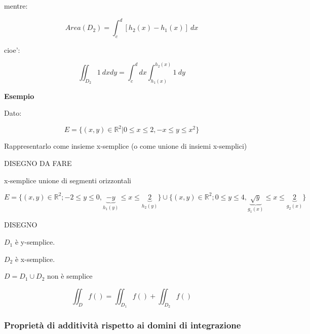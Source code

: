\documentclass[../appunti-analisi.tex]{subfiles}
\begin{document}
mentre:

\[
    Area(D_2) = \int_{c}^{d} {[h_2(x) -h_1(x)]} \: dx 
\]

cioe':

\[
    \iint_{D_2} {1} \: d x d y = \int_{c}^{d} {dx \int_{h_1(x)}^{h_2(x)} {1} \: d y }
\]



\textbf{Esempio} 

Dato:

\[
    E = \{(x,y) \in \mathbb{R}^{2}| 0 \le x \le 2, -x \le y \le x^{2}\}
\]

Rappresentarlo come insieme x-semplice (o come unione di insiemi x-semplici)


DISEGNO DA FARE


x-semplice unione di segmenti orizzontali

\[
    E = \{(x,y) \in \mathbb{R}^{2}; -2 \le y \le 0, \underbrace{-y}_\text{$h_1(y)$} \le x \le \underbrace{2}_\text{$h_2(y)$}\} \cup \{(x,y) \in \mathbb{R}^{2}; 0 \le y \le 4, \underbrace{\sqrt{y}}_\text{$g_1(x)$} \le  x \le \underbrace{2}_\text{$g_2(x)$}\}
\]


DISEGNO

$D_1$ è y-semplice.

$D_2$ è x-semplice.

$D = D_1 \cup D_2$ non è semplice

\[
    \iint_D {f()} = \iint_{D_1} {f()} + \iint_{D_2} {f()}
\]

\subsubsection{Proprietà di additività rispetto ai domini di integrazione}
\end{document}

